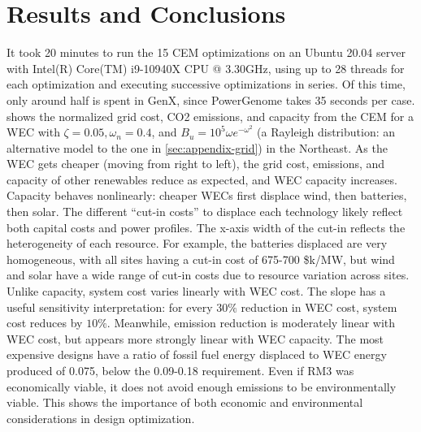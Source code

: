 \section{Results and Conclusions}
It took 20 minutes to run the 15 CEM optimizations on an Ubuntu 20.04 server with Intel(R) Core(TM) i9-10940X CPU @ 3.30GHz, using up to 28 threads for each optimization and executing successive optimizations in series.
Of this time, only around half is spent in GenX, since PowerGenome takes 35 seconds per case. %
 shows the normalized grid cost, CO2 emissions, and capacity from the CEM for a WEC with $\zeta=0.05, \omega_n=0.4$, and $B_{u}=10^5\omega e^{-\omega^2}$ (a Rayleigh distribution: an alternative model to the one in \cref{sec:appendix-grid}) in the Northeast.
As the WEC gets cheaper (moving from right to left), %
the grid cost, emissions, and capacity of other renewables reduce as expected, and WEC capacity increases.
Capacity behaves nonlinearly: cheaper WECs first displace wind, then batteries, then solar.
The different ``cut-in costs'' to displace each technology likely reflect both capital costs and power profiles.
The x-axis width of the cut-in reflects the heterogeneity of each resource.
For example, the batteries displaced are very homogeneous, with all sites having a cut-in cost of 675-700 \$k/MW, but wind and solar have a wide range of cut-in costs due to resource variation across sites.
Unlike capacity, system cost varies linearly with WEC cost.
The slope has a useful sensitivity interpretation: for every $30\%$ reduction in WEC cost, system cost reduces by $10\%$.
Meanwhile, emission reduction is moderately linear with WEC cost, but appears more strongly linear with WEC capacity.
The most expensive designs have a ratio of fossil fuel energy displaced to WEC energy produced of 0.075, below the 0.09-0.18 requirement.
Even if RM3 was economically viable, it does not avoid enough emissions to be environmentally viable.
This shows the importance of both economic and environmental considerations in design optimization.

